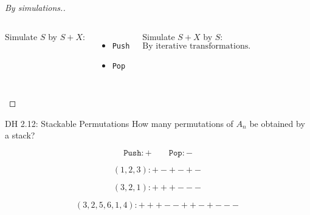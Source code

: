 \begin{frame}{}
  \begin{columns}[b]
  \end{columns}

  \vspace{0.40cm}
  \pause
  \begin{proof}[\large By simulations.]
    \begin{columns}[t]
      \pause
        Simulate $S$ by $S + X$:
	\begin{itemize}
	  \item \texttt{Push}
	  \item \texttt{Pop}
	\end{itemize}
      \pause
        Simulate $S + X$ by $S$:
	\pause
	\[
	  \text{By iterative transformations.}
	\]
    \end{columns}
  \end{proof}
\end{frame}

\begin{frame}{}
  \begin{exampleblock}{DH 2.12: Stackable Permutations}
    How many permutations of $A_n$  be obtained by a stack?
  \end{exampleblock}

  \pause

  \[
    \texttt{Push}: + \qquad \texttt{Pop}: -
  \]

  \pause
  \[
    (1, 2, 3): +-+-+-
  \]

  \[
    (3, 2, 1): +++---
  \]

  \pause
  \[
    (3, 2, 5, 6, 1, 4): +++--++-+---
  \]
\end{frame}

